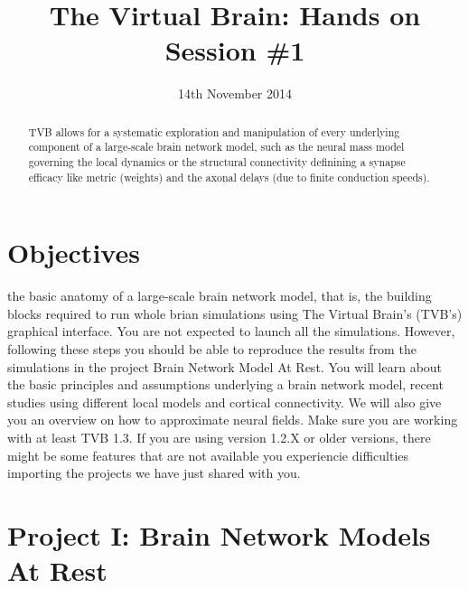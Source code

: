 \documentclass{tufte-handout}
\title{The Virtual Brain: Hands on Session \#1}
\date{14th November 2014}
\begin{document}

\newpage
\ClearWallPaper
\begin{abstract}
\noindent 
TVB allows for a systematic exploration and manipulation of every underlying
component of a large-scale brain network model, such as the neural mass model
governing the local dynamics  or the structural connectivity definining a synapse efficacy
like metric (weights) and the axonal delays (due to finite conduction speeds).

\begin{marginfigure}%
  \label{fig:marginfig}
\end{marginfigure}
\end{abstract}

\section{Objectives}\label{sec:objectives}

the basic anatomy of a large-scale brain network model, that is, the building
blocks required to run whole brian simulations using The Virtual Brain's
(TVB's) graphical interface. You are not expected to launch all the
simulations. However, following these steps you should be able to reproduce
the results from the simulations in the project Brain Network Model At Rest.
You will learn about the basic principles and assumptions underlying a brain
network model, recent studies using different local models and cortical
connectivity. We will also give you an overview on how to approximate neural
fields. Make sure you are working with at least TVB 1.3. If you are using
version 1.2.X or older versions, there might be some features that are not
available you experiencie difficulties importing the projects we have just
shared with you.


\section{Project I: Brain Network Models At Rest}\label{sec:project_data}
\end{document}
